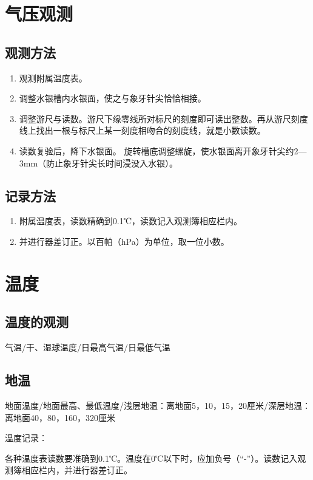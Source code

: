 ﻿\documentclass[UTF8,11pt]{ctexbook}%
\begin{document}
\section{气压观测}

\subsection{观测方法}

\begin{enumerate}
	\item 观测附属温度表。
	\item 调整水银槽内水银面，使之与象牙针尖恰恰相接。
	\item 调整游尺与读数。游尺下缘零线所对标尺的刻度即可读出整数。再从游尺刻度线上找出一根与标尺上某一刻度相吻合的刻度线，就是小数读数。
	\item 读数复验后，降下水银面。 旋转槽底调整螺旋，使水银面离开象牙针尖约2—3mm（防止象牙针尖长时间浸没入水银）。
\end{enumerate}

\subsection{记录方法}

\begin{enumerate}
	\item 附属温度表，读数精确到0.1℃，读数记入观测簿相应栏内。
	\item 并进行器差订正。以百帕（hPa）为单位，取一位小数。
\end{enumerate}

\section{温度}

\subsection{温度的观测}

气温/干、湿球温度/日最高气温/日最低气温

\subsection{地温}

地面温度/地面最高、最低温度/浅层地温：离地面5，10，15，20厘米/深层地温：离地面40，80，160，320厘米

温度记录：

各种温度表读数要准确到0.1℃。温度在0℃以下时，应加负号（“-”）。读数记入观测簿相应栏内，并进行器差订正。
\end{document}
